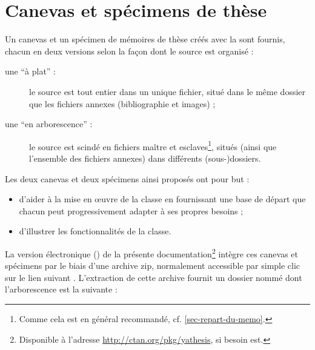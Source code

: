 \chapter{Canevas et spécimens de thèse}\label{cha-specimen-canevas}%

Un canevas et un spécimen de mémoires de thèse créés avec la \yatcl sont
fournis, chacun en deux versions selon la façon dont le source  est
organisé :
\begin{description}
\item[une \enquote{à plat} :] le source est tout entier dans un unique fichier,
  situé dans le même dossier que les fichiers annexes (bibliographie et
  images) ;
\item[une \enquote{en arborescence} :] le source est scindé en fichiers maître
  et esclaves\footnote{Comme cela est en général recommandé,
    cf. \vref{sec-repart-du-memo}.}, situés (ainsi que l'ensemble des fichiers
  annexes) dans différents (sous-)dossiers.
\end{description}
Les deux canevas et deux spécimens ainsi proposés ont pour but :
\begin{itemize}
\item d'aider à la mise en œuvre de la classe en fournissant une base de départ
  que chacun peut progressivement adapter à ses propres
  besoins ;
\item d'illustrer les fonctionnalités de la classe.
\end{itemize}

La version électronique (\pdf{}) de la présente
documentation\footnote{Disponible à l'adresse
  \url{http://ctan.org/pkg/yathesis}, si besoin est.} intègre ces canevas et
spécimens par le biais d'une archive \gls{zip}, normalement accessible par
simple clic sur le lien suivant
. L'extraction
de cette archive fournit un dossier nommé  dont l'arborescence
est la suivante :

\setlength{\DTbaselineskip}{15pt}
\begin{tcolorbox}
\end{tcolorbox}


